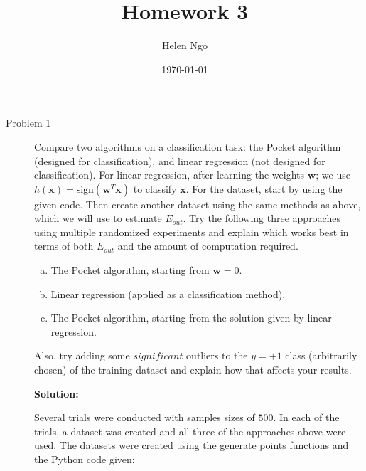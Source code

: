 \documentclass[a4paper]{article}
\title{Homework 3}
\author{Helen Ngo}
\date{\today}
\begin{document}
\lstset{language=Python}

\maketitle

\begin {description}

\item[Problem 1] Compare two algorithms on a classification task: the Pocket algorithm (designed for classification), and linear regression (not designed for classification). For linear regression, after learning the weights $\textbf{w}$; we use $h(\textbf{x}) = \textrm{sign}(\textbf{w}^T\textbf{x})$ to classify $\textbf{x}$. For the dataset, start by using the given code. Then create another dataset using the same methods as above, which we will use to estimate $E_{out}$. Try the following three approaches using multiple randomized experiments and explain which works best in terms of both $E_{out}$ and the amount of computation required. 

\begin{enumerate}[(a)]
\item The Pocket algorithm, starting from $\textbf{w} = 0$.
\item Linear regression (applied as a classification method).
\item The Pocket algorithm, starting from the solution given by linear regression.
\end{enumerate}

Also, try adding some $significant$ outliers to the $y = +1$ class (arbitrarily chosen) of the training dataset and explain how that affects your results.

\smallskip

\textbf{Solution:}
\begin{doublespace}
Several trials were conducted with samples sizes of $500$. In each of the trials, a dataset was created and all three of the approaches above were used. The datasets were created using the generate points functions and the Python code given:





\end{doublespace}
\end{description}
\end{document}
